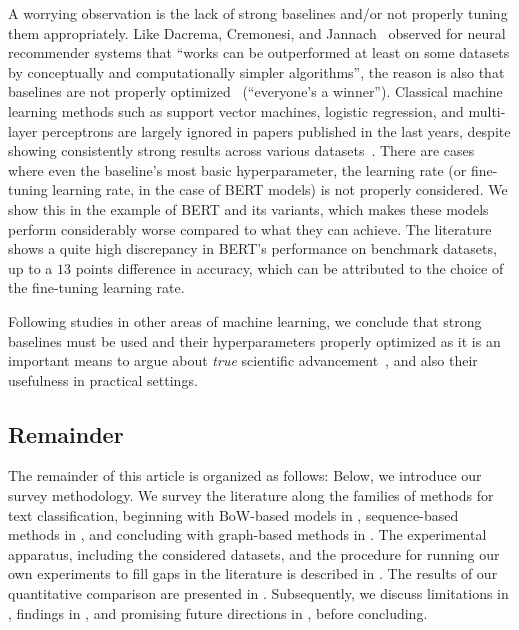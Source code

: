 \documentclass[acmsmall,nonacm]{acmart}
\begin{document}
A worrying observation is the lack of strong baselines and/or not properly tuning them appropriately.
Like Dacrema, Cremonesi, and Jannach~\cite{DBLP:conf/recsys/DacremaCJ19} observed for neural recommender systems that ``works can be outperformed at least on some datasets by conceptually and computationally simpler algorithms'', the reason is also that baselines are not properly optimized~\cite{DBLP:conf/recsys/ShehzadJ23} (``everyone's a winner'').
Classical machine learning methods such as support vector machines, logistic regression, and multi-layer perceptrons are largely ignored in papers published in the last years, despite showing consistently strong results across various datasets~\cite{galke2023really,galkescherp-acl2022,DBLP:conf/wsdm/RageshSIBL21}.
There are cases where even the baseline's most basic hyperparameter, the learning rate (or fine-tuning learning rate, in the case of BERT models) is not properly considered.
We show this in the example of BERT and its variants, which makes these models perform considerably worse compared to what they can achieve.
The literature shows a quite high discrepancy in BERT's performance on benchmark datasets, up to a $13$ points difference in accuracy, which can be attributed to the choice of the fine-tuning learning rate.

Following studies in other areas of machine learning, we conclude that strong baselines must be used and their hyperparameters properly optimized as it is an important means to argue about \textit{true} scientific advancement~\cite{DBLP:conf/acl/HenaoLCSSWWMZ18,DBLP:conf/recsys/DacremaCJ19}, and also their usefulness in practical settings.

\subsection{Remainder}

The remainder of this article is organized as follows: 
Below, we introduce our survey methodology.
We survey the literature along the families of methods for text classification, beginning with BoW-based models in , sequence-based methods in , and concluding with graph-based methods in .
The experimental apparatus, including the considered datasets, and the procedure for running our own experiments to fill gaps in the literature is described in .
The results of our quantitative comparison are presented in .
Subsequently, we discuss limitations in , findings in , and promising future directions in , before concluding.
\end{document}
